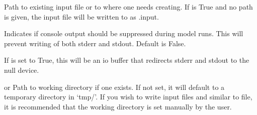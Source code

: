 \documentclass[letterpaper,10pt,english]{sphinxmanual}
\begin{document}
\begin{fulllineitems}
\begin{fulllineitems}
\end{fulllineitems}


\begin{fulllineitems}
\label{\detokenize{bcmdModel:bayescmd.bcmdModel.bcmd_model.ModelBCMD.input_file}}
 \textendash{} Path to existing input file or to where one needs creating. If
{\hyperref[\detokenize{bcmdModel:bayescmd.bcmdModel.bcmd_model.ModelBCMD.create_input}]{}} is True and no path is given, the input file will
be written to {\hyperref[\detokenize{bcmdModel:bayescmd.bcmdModel.bcmd_model.ModelBCMD.workdir}]{}} as {\hyperref[\detokenize{bcmdModel:bayescmd.bcmdModel.bcmd_model.ModelBCMD.model_name}]{}}.input.

\end{fulllineitems}


\begin{fulllineitems}
\label{\detokenize{bcmdModel:bayescmd.bcmdModel.bcmd_model.ModelBCMD.suppress}}
 \textendash{} Indicates if console output should be suppressed during model runs.
This will prevent writing of both stderr and stdout. Default is False.

\end{fulllineitems}


\begin{fulllineitems}
\label{\detokenize{bcmdModel:bayescmd.bcmdModel.bcmd_model.ModelBCMD.DEVNULL}}
 \textendash{} If {\hyperref[\detokenize{bcmdModel:bayescmd.bcmdModel.bcmd_model.ModelBCMD.suppress}]{}} is set to True, this will be an io buffer that
redirects stderr and stdout to the null device.

\end{fulllineitems}


\begin{fulllineitems}
\label{\detokenize{bcmdModel:bayescmd.bcmdModel.bcmd_model.ModelBCMD.workdir}}
 or  \textendash{} Path to working directory if one exists. If not set, it will default
to a temporary directory in ‘tmp/’. If you wish to write input files
and similar to file, it is recommended that the working directory is
set manually by the user.


\end{fulllineitems}
\end{fulllineitems}
\end{document}
